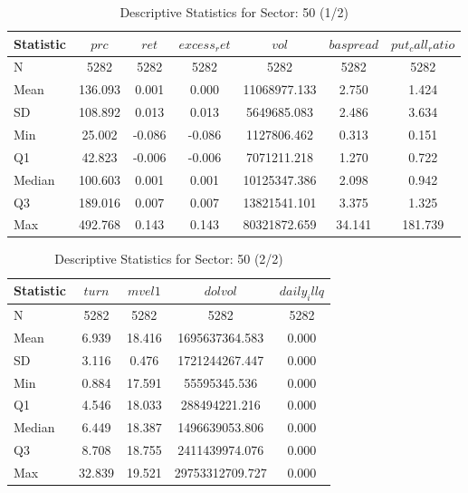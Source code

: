    \begin{table}[ht]
    \centering

    
    \caption{Descriptive Statistics for Sector: 50 (1/2)}
    \label{tab:sec50_a}
    
    \begin{tabular}{lcccccc}
    \toprule
    Statistic & $prc$ & $ret$ & $excess_ret$ & $vol$ & $baspread$ & $put_call_ratio$ \\\midrule
    N & 5282 & 5282 & 5282 & 5282 & 5282 & 5282 \\
    Mean & 136.093 & 0.001 & 0.000 & 11068977.133 & 2.750 & 1.424 \\
    SD & 108.892 & 0.013 & 0.013 & 5649685.083 & 2.486 & 3.634 \\
    Min & 25.002 & -0.086 & -0.086 & 1127806.462 & 0.313 & 0.151 \\
    Q1 & 42.823 & -0.006 & -0.006 & 7071211.218 & 1.270 & 0.722 \\
    Median & 100.603 & 0.001 & 0.001 & 10125347.386 & 2.098 & 0.942 \\
    Q3 & 189.016 & 0.007 & 0.007 & 13821541.101 & 3.375 & 1.325 \\
    Max & 492.768 & 0.143 & 0.143 & 80321872.659 & 34.141 & 181.739 \\
    \bottomrule
    \end{tabular}

    \end{table}
    
    \begin{table}[ht]
    \centering

    
    \caption{Descriptive Statistics for Sector: 50 (2/2)}
    \label{tab:sec50_b}
    
    \begin{tabular}{lcccc}
    \toprule
    Statistic & $turn$ & $mvel1$ & $dolvol$ & $daily_illq$ \\\midrule
    N & 5282 & 5282 & 5282 & 5282 \\
    Mean & 6.939 & 18.416 & 1695637364.583 & 0.000 \\
    SD & 3.116 & 0.476 & 1721244267.447 & 0.000 \\
    Min & 0.884 & 17.591 & 55595345.536 & 0.000 \\
    Q1 & 4.546 & 18.033 & 288494221.216 & 0.000 \\
    Median & 6.449 & 18.387 & 1496639053.806 & 0.000 \\
    Q3 & 8.708 & 18.755 & 2411439974.076 & 0.000 \\
    Max & 32.839 & 19.521 & 29753312709.727 & 0.000 \\
    \bottomrule
    \end{tabular}

    \end{table}
    
